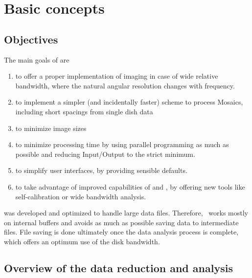 \section{Basic concepts}

\subsection{Objectives}

The main goals of \imager{} are
\begin{enumerate}
\item to offer a proper implementation of imaging in case of
wide relative bandwidth, where the natural angular resolution
changes with frequency.
\item to implement a simpler (and incidentally faster) scheme to process Mosaics,
including short spacings from single dish data
\item to minimize image sizes 
\item to minimize processing time by using parallel
programming as much as possible and reducing Input/Output to the strict minimum.
\item to simplify user interfaces, by providing sensible defaults.
\item to take advantage of improved capabilities of \NOEMA{} and \ALMA{}, by offering new
tools like self-calibration or wide bandwidth analysis.
\end{enumerate}

\imager{} was developed and optimized to handle large data files. Therefore, 
\imager{}\  works mostly on internal buffers and avoids as much as possible saving data to intermediate files. 
File saving is done ultimately once the data analysis process is complete, 
which offers an optimum use of the disk bandwidth.

\subsection{Overview of the data reduction and analysis}

